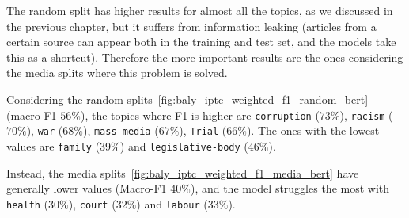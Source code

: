 The random split has higher results for almost all the topics, as we discussed in the previous chapter, but it suffers from information leaking (articles from a certain source can appear both in the training and test set, and the models take this as a shortcut).
Therefore the more important results are the ones considering the media splits where this problem is solved.

Considering the random splits~\ref{fig:baly_iptc_weighted_f1_random_bert} (macro-F1 $56\%$), the topics where F1 is higher are \texttt{corruption} ($73\%$), \texttt{racism} ($70\%$), \texttt{war} ($68\%$), \texttt{mass-media} ($67\%$), \texttt{Trial} ($66\%$). The ones with the lowest values are \texttt{family} ($39\%$) and \texttt{legislative-body} ($46\%$).

Instead, the media splits~\ref{fig:baly_iptc_weighted_f1_media_bert} have generally lower values (Macro-F1 $40\%$), and the model struggles the most with \texttt{health} ($30\%$), \texttt{court} ($32\%$) and \texttt{labour} ($33\%$).

